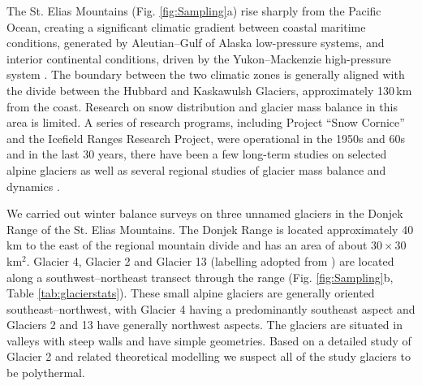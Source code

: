\documentclass{sfuthesis}
\begin{document}
The St. Elias Mountains (Fig. \ref{fig:Sampling}a) rise sharply from the Pacific Ocean, creating a significant climatic gradient between coastal maritime conditions, generated by Aleutian--Gulf of Alaska low-pressure systems, and interior continental conditions, driven by the Yukon--Mackenzie high-pressure system \citep{Taylor1969}. The boundary between the two climatic zones is generally aligned with the divide between the Hubbard and Kaskawulsh Glaciers, approximately 130\,km from the coast. Research on snow distribution and glacier mass balance in this area is limited. A series of research programs, including Project ``Snow Cornice''  and the Icefield Ranges Research Project, were operational in the 1950s and 60s \citep{Wood1948, Danby2003} and in the last 30 years, there have been a few long-term studies on selected alpine glaciers \citep[e.g.][]{Clarke2014} as well as several regional studies of glacier mass balance and dynamics \citep[e.g.][]{Arendt2008, Burgess2013,Waechter2015}.

We carried out winter balance surveys on three unnamed glaciers in the Donjek Range of the St. Elias Mountains. The Donjek Range is located approximately 40 km to the east of the regional mountain divide and has an area of about $30\times30$\,km$^2$. Glacier 4, Glacier 2 and Glacier 13 (labelling adopted from \cite{Crompton2016}) are located along a southwest--northeast transect through the range (Fig. \ref{fig:Sampling}b, Table \ref{tab:glacierstats}). These small alpine glaciers are generally oriented southeast--northwest, with Glacier 4 having a predominantly southeast aspect and Glaciers 2 and 13 have generally northwest aspects. The glaciers are situated in valleys with steep walls and have simple geometries. Based on a detailed study of Glacier 2  \citep{Wilson2013} and related theoretical modelling \citep{Wilson2013a} we suspect all of the study glaciers to be polythermal. 
\end{document}
